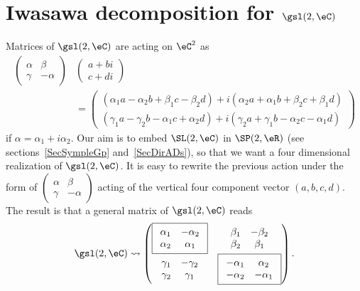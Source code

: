 \section{Iwasawa decomposition for \texorpdfstring{$\gsl(2,\eC)$}{sl2C}}		\label{SecIwasldeuxC}

Matrices of $\gsl(2,\eC)$ are acting on $\eC^2$ as
\[
	\begin{split}
		\begin{pmatrix}
			\alpha & \beta \\\gamma&-\alpha
		\end{pmatrix} &
		\begin{pmatrix}
			a+bi \\c+di
		\end{pmatrix}                      \\
		                                & =
		\begin{pmatrix}
			(\alpha_1a-\alpha_2b+\beta_1c-\beta_2d)+i(\alpha_2a+\alpha_1b+\beta_2c+\beta_1d) \\
			(\gamma_1a-\gamma_2b-\alpha_1c+\alpha_2d)+i(\gamma_2a+\gamma_1b-\alpha_2c-\alpha_1d)
		\end{pmatrix}
	\end{split}
\]
if $\alpha=\alpha_1+i\alpha_2$.  Our aim is to embed $\SL(2,\eC)$ in $\SP(2,\eR)$ (see sections~\ref{SecSympleGp} and~\ref{SecDirADs}), so that we want a four dimensional realization of $\gsl(2,\eC)$. It is easy to rewrite the previous action under the form of $\begin{pmatrix}
		\alpha & \beta \\\gamma&-\alpha
	\end{pmatrix}$ acting of the vertical four component vector $(a,b,c,d)$. The result is that a general matrix of $\gsl(2,\eC)$ reads
\begin{equation}		\label{EqGenslMatr}
	\gsl(2,\eC)\leadsto
	\begin{pmatrix}
		\boxed{
			\begin{array}{cc}
				\alpha_1 & -\alpha_2 \\
				\alpha_2 & \alpha_1
			\end{array}
		}                       &
		\begin{array}{cc}
			\beta_1 & -\beta_2 \\
			\beta_2 & \beta_1
		\end{array}        \\
		\begin{array}{cc}
			\gamma_1 & -\gamma_2 \\
			\gamma_2 & \gamma_1
		\end{array} &
		\boxed{
			\begin{array}{cc}
				-\alpha_1 & \alpha_2  \\
				-\alpha_2 & -\alpha_1
			\end{array}
		}
	\end{pmatrix}.
\end{equation}
